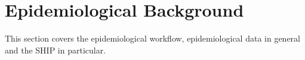 \documentclass[journal]{style/vgtc} 			          %
\begin{document}
\section{Epidemiological Background} \label{sec:Background}
This section covers the epidemiological workflow, epidemiological data in general and the SHIP in particular.
\end{document}
